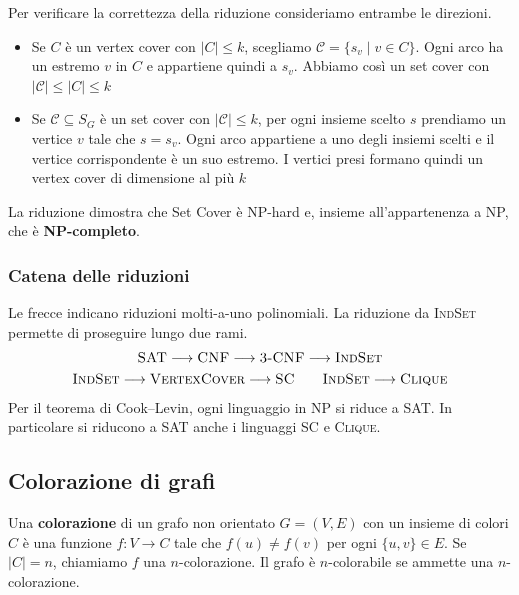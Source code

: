 \medskip
\noindent
Per verificare la correttezza della riduzione consideriamo
entrambe le direzioni.
\begin{itemize}
    \item Se $C$ è un vertex cover con $|C|\le k$, scegliamo
          $\mathcal{C}=\{s_v\mid v\in C\}$. Ogni arco ha un
          estremo $v$ in $C$ e appartiene quindi a $s_v$.
          Abbiamo così un set cover con $|\mathcal{C}|\le |C|\le k$
    \item Se $\mathcal{C}\subseteq S_G$ è un set cover con
          $|\mathcal{C}|\le k$, per ogni insieme scelto $s$
          prendiamo un vertice $v$ tale che $s=s_v$. Ogni
          arco appartiene a uno degli insiemi scelti e il
          vertice corrispondente è un suo estremo. I vertici
          presi formano quindi un vertex cover di dimensione al più $k$
\end{itemize}
\noindent
La riduzione dimostra che Set Cover è NP-hard e, insieme
all'appartenenza a NP, che è \textbf{NP-completo}.

\subsubsection*{Catena delle riduzioni}
Le frecce indicano riduzioni molti-a-uno polinomiali. La
riduzione da \textsc{IndSet} permette di proseguire lungo
due rami.
\[
    \begin{gathered}
        \textsc{SAT}\longrightarrow\textsc{CNF}\longrightarrow
        \textsc{3-CNF}\longrightarrow\textsc{IndSet}\\
        \textsc{IndSet}\longrightarrow\textsc{VertexCover}\longrightarrow
        \textsc{SC}
        \qquad
        \textsc{IndSet}\longrightarrow\textsc{Clique}
    \end{gathered}
\]
Per il teorema di Cook--Levin, ogni linguaggio in NP si riduce
a \textsc{SAT}. In particolare si riducono a \textsc{SAT}
anche i linguaggi \textsc{SC} e \textsc{Clique}.

\subsection{Colorazione di grafi}
\noindent
\colorbox{SALZO}{\parbox{\dimexpr\linewidth-2\fboxsep}{
\begin{definition}[Colorazione]
    Una \textbf{colorazione} di un grafo non orientato
    $G=(V,E)$ con un insieme di colori $C$ è una funzione
    $f:V\to C$ tale che $f(u)\ne f(v)$ per ogni $\{u,v\}\in E$.
    Se $|C|=n$, chiamiamo $f$ una $n$-colorazione. Il grafo
    è $n$-colorabile se ammette una $n$-colorazione.
\end{definition}
}}%

